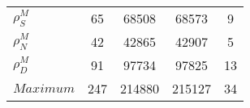 \begin{center}
\begin{longtable}{lcccc}
$ {\rho^{M}_{S}}       $	 & 	                   65	 & 	                68508	 & 	                68573	 & 	                    9 \\ 
$ {\rho^{M}_{N}}       $	 & 	                   42	 & 	                42865	 & 	                42907	 & 	                    5 \\ 
$ {\rho^{M}_{D}}       $	 & 	                   91	 & 	                97734	 & 	                97825	 & 	                   13 \\ 
$Maximum               $	 & 	                  247	 & 	               214880	 & 	               215127	 & 	                   34 \\ 
\end{longtable}
 \end{center}
